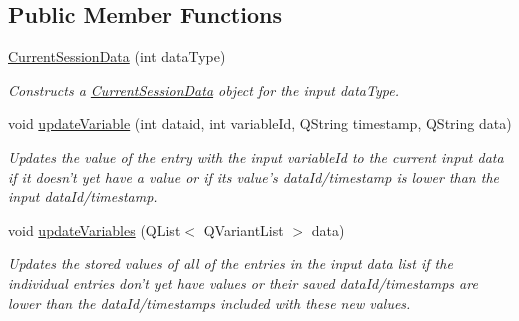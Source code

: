 \subsection*{Public Member Functions}
\begin{DoxyCompactItemize}
\item 
\hypertarget{class_current_session_data_af78242fa37935fad3fe1445ac93ba7c1}{\hyperlink{class_current_session_data_af78242fa37935fad3fe1445ac93ba7c1}{Current\-Session\-Data} (int data\-Type)}\label{class_current_session_data_af78242fa37935fad3fe1445ac93ba7c1}

\begin{DoxyCompactList}\small\item\em Constructs a \hyperlink{class_current_session_data}{Current\-Session\-Data} object for the input data\-Type. \end{DoxyCompactList}\item 
void \hyperlink{class_current_session_data_a5db07b16051edc476dcf815d8c690688}{update\-Variable} (int dataid, int variable\-Id, Q\-String timestamp, Q\-String data)
\begin{DoxyCompactList}\small\item\em Updates the value of the entry with the input variable\-Id to the current input data if it doesn't yet have a value or if its value's data\-Id/timestamp is lower than the input data\-Id/timestamp. \end{DoxyCompactList}\item 
void \hyperlink{class_current_session_data_abd0e52b87a97c937baa8075ed36c05a8}{update\-Variables} (Q\-List$<$ Q\-Variant\-List $>$ data)
\begin{DoxyCompactList}\small\item\em Updates the stored values of all of the entries in the input data list if the individual entries don't yet have values or their saved data\-Id/timestamps are lower than the data\-Id/timestamps included with these new values. \end{DoxyCompactList}\end{DoxyCompactItemize}
